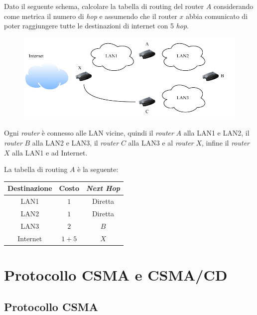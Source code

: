 \documentclass[a4paper]{article}
\begin{document}
	Dato il seguente schema, calcolare la tabella di routing del router $A$ considerando come metrica il numero di \emph{hop} e assumendo che il router $x$ abbia comunicato di poter raggiungere tutte le destinazioni di internet con 5 \emph{hop}.
	
	\begin{figure}[!htp]
		\centering
		\includegraphics[width=.88\textwidth]{img/tab_routing.pdf}
	\end{figure}

	\noindent
	Ogni \emph{router} è connesso alle \textsf{LAN} vicine, quindi il \emph{router} $A$ alla \textsf{LAN1} e \textsf{LAN2}, il \emph{router} $B$ alla \textsf{LAN2} e \textsf{LAN3}, il \emph{router} $C$ alla \textsf{LAN3} e al \emph{router} $X$, infine il \emph{router} $X$ alla \textsf{LAN1} e ad Internet.\newline
	
	\noindent
	La tabella di routing $A$ è la seguente:
	\begin{table}[!htbp]
		\centering
		\begin{tabular}{@{} c c c @{}}
			\toprule
			Destinazione	& Costo	& \emph{Next Hop} \\
			\midrule
			\textsf{LAN1}		& $1$	& Diretta \\
			\textsf{LAN2}		& $1$	& Diretta \\
			\textsf{LAN3}		& $2$	& $B$ \\
			\textsf{Internet}	& $1+5$	& $X$ \\
			\bottomrule
		\end{tabular}
	\end{table}\newpage

	\section{Protocollo CSMA e CSMA/CD}
	
	\subsection{Protocollo CSMA}
	
\end{document}
